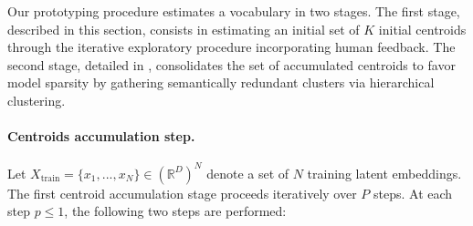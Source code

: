         Our prototyping procedure estimates a vocabulary in two stages. The first stage, described in this section, consists in estimating an initial set of $K$ initial centroids through the iterative exploratory procedure incorporating human feedback. The second stage, detailed in , consolidates the set of accumulated centroids to favor model sparsity by gathering semantically redundant clusters via hierarchical clustering. %

        \paragraph{Centroids accumulation step.\\}

        Let $X_{\text{train}} = \{ x_1, ..., x_N \} \in (\mathbb{R}^{D})^N$ denote a set of $N$ training latent embeddings. The first centroid accumulation stage proceeds iteratively over $P$ steps. At each step $p \leq 1$, the following two steps are performed:

